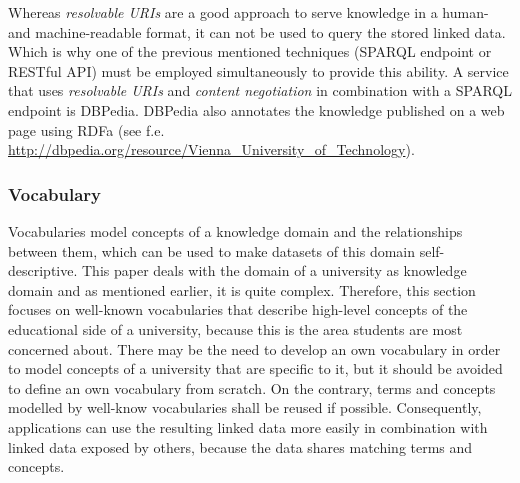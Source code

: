 \documentclass{article}
\begin{document}
Whereas \textit{resolvable URIs} are a good approach to serve knowledge in a human- and machine-readable format, it can not be used to query the stored linked data. Which is why one of the previous mentioned techniques (SPARQL endpoint or RESTful API) must be employed simultaneously to provide this ability. A service that uses \textit{resolvable URIs} and \textit{content negotiation} in combination with a SPARQL endpoint is DBPedia. DBPedia also annotates the knowledge published on a web page using RDFa (see f.e. \url{http://dbpedia.org/resource/Vienna_University_of_Technology}).

\subsubsection{Vocabulary}
\label{technical-architecture-challenges:proposal:vocabulary}
Vocabularies model concepts of a knowledge domain and the relationships between them, which can be used to make datasets of this domain self-descriptive. This paper deals with the domain of a university as knowledge domain and as mentioned earlier, it is quite complex. Therefore, this section focuses on well-known vocabularies that describe high-level concepts of the educational side of a university, because this is the area students are most concerned about. There may be the need to develop an own vocabulary in order to model concepts of a university that are specific to it, but it should be avoided to define an own vocabulary from scratch. On the contrary, terms and concepts modelled by well-know vocabularies shall be reused if possible. Consequently, applications can use the resulting linked data more easily in combination with linked data exposed by others, because the data shares matching terms and concepts.
\end{document}
